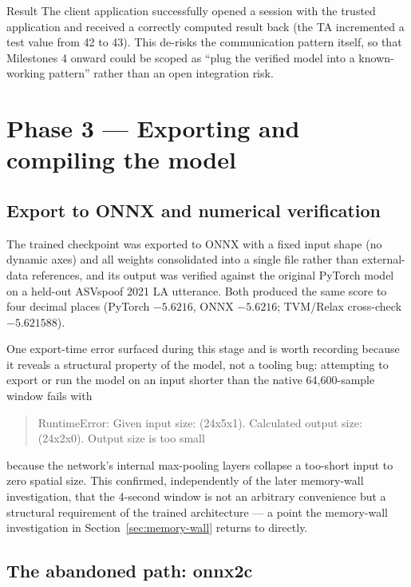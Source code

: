 \documentclass[11pt,a4paper]{report}
\begin{document}
\begin{resolvedbox}{Result}
The client application successfully opened a session with the trusted application and received a
correctly computed result back (the TA incremented a test value from 42 to 43). This de-risks the
communication pattern itself, so that Milestones 4 onward could be scoped as ``plug the verified
model into a known-working pattern'' rather than an open integration risk.
\end{resolvedbox}

\section{Phase 3 --- Exporting and compiling the model}
\label{sec:onnx2c-vs-emx}

\subsection{Export to ONNX and numerical verification}

The trained checkpoint was exported to ONNX with a fixed input shape (no dynamic axes) and all
weights consolidated into a single file rather than external-data references, and its output was
verified against the original PyTorch model on a held-out ASVspoof 2021 LA utterance. Both produced
the same score to four decimal places (PyTorch $-5.6216$, ONNX $-5.6216$; TVM/Relax cross-check
$-5.621588$).

One export-time error surfaced during this stage and is worth recording because it reveals a
structural property of the model, not a tooling bug: attempting to export or run the model on an
input shorter than the native 64,600-sample window fails with
\begin{quote}\small\ttfamily
RuntimeError: Given input size: (24x5x1). Calculated output size: (24x2x0). Output size is too
small
\end{quote}
because the network's internal max-pooling layers collapse a too-short input to zero spatial size.
\label{sec:window-attempt}
This confirmed, independently of the later memory-wall investigation, that the 4-second window is
not an arbitrary convenience but a structural requirement of the trained architecture --- a point
the memory-wall investigation in Section~\ref{sec:memory-wall} returns to directly.

\subsection{The abandoned path: onnx2c}
\label{sec:onnx2c}
\end{document}
